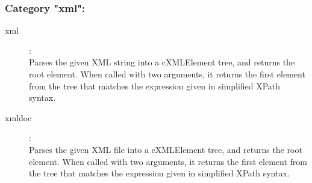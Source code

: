 \subsubsection{Category "xml":}

\begin{description}
\item[xml]:  \\
    Parses the given XML string into a cXMLElement tree, and returns the root element. When called with two arguments, it returns the first element from the tree that matches the expression given in simplified XPath syntax.
\item[xmldoc]:  \\
    Parses the given XML file into a cXMLElement tree, and returns the root element. When called with two arguments, it returns the first element from the tree that matches the expression given in simplified XPath syntax.
\end{description}

